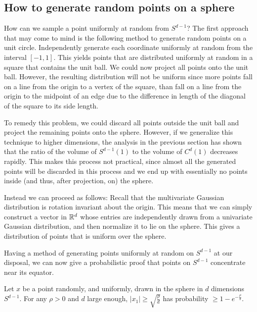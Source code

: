 \subsection{How to generate random points on a sphere}

How can we sample a point uniformly at random from $S^{d-1}$? The first approach that may come to mind is
the following method to generate random points on a unit circle. Independently generate each coordinate  uniformly at random from the interval $[-1,1]$. This yields points that are distributed uniformly at random
in a square that contains the unit ball. We could now project all points onto the unit ball. However,
the resulting distribution will not be uniform since more points fall on a line from the origin to a
vertex of the square, than fall on a line from the origin to the midpoint of an edge due to the
difference in length of the diagonal of the square to its side length.

To remedy this problem, we could
discard all points outside the unit ball and project the remaining points onto the sphere. However, if we generalize this technique  to higher dimensions, the analysis in the previous section has shown that
the ratio of the volume of $S^{d-1}(1)$ to the volume of $C^d(1)$ decreases rapidly. This makes this process not practical, since almost all the generated points will be discarded in this process and we end up with essentially no points inside (and thus, after projection, on) the sphere.


Instead we can proceed as follows: Recall that the multivariate Gaussian distribution is rotation invariant about the origin. This means that we can simply construct a vector in $\mathbb{R}^d$ whose entries are independently drawn from a univariate Gaussian distribution, and then normalize it to lie on the sphere. This gives a distribution of points that is uniform over the sphere.



\medskip
Having a method of generating  points uniformly at random on $S^{d-1}$ at our disposal, we can now give a probabilistic proof that points on  $S^{d-1}$ concentrate near its equator.

\begin{theorem}\label{theorem:spheremostlyinequator}
Let $x$ be a point randomly, and uniformly, drawn in the sphere in $d$ dimensions $S^{d-1}$. For any $\rho>0$ and $d$ large enough, $|x_1|\geq \sqrt{\frac{\rho}d}$ has probability $\geq 1-e^{-\frac{\rho}3}$.
\end{theorem}

